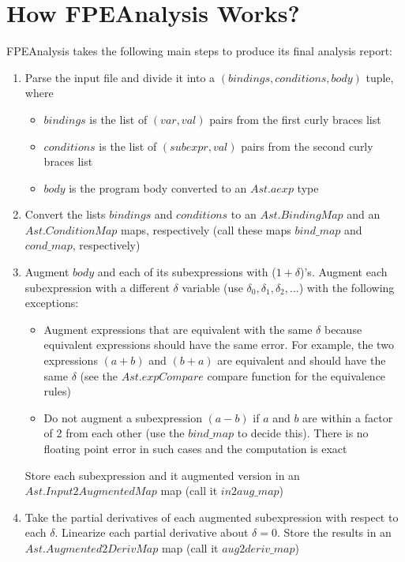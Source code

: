 \documentclass{article}
\begin{document}
\section{How FPEAnalysis Works?}
FPEAnalysis takes the following main steps to produce its final analysis report:
\begin{enumerate}
	\item Parse the input file and divide it into a $(bindings, conditions, body)$ tuple, where 
	\begin{itemize}
		\item $bindings$ is the list of $(var, val)$ pairs from the first curly braces list
		\item $conditions$ is the list of $(subexpr, val)$ pairs from the second curly braces list
		\item $body$ is the program body converted to an $Ast.aexp$ type
	\end{itemize}
	
	\item Convert the lists $bindings$ and $conditions$ to an $Ast.BindingMap$ and an $Ast.ConditionMap$ maps, respectively (call these maps $bind\_map$ and $cond\_map$, respectively) 

	\item Augment $body$ and each of its subexpressions with ($1 + \delta$)'s. Augment each subexpression with a different $\delta$ variable (use $\delta_0, \delta_1, \delta_2, ...$) with the following exceptions:
	\begin{itemize}
		\item Augment expressions that are equivalent with the same $\delta$ because equivalent expressions should have the same error. For example, the two expressions $(a + b)$ and $(b + a)$ are equivalent and should have the same $\delta$ (see the $Ast.expCompare$ compare function for the equivalence rules)
		\item Do not augment a subexpression $(a - b)$ if $a$ and $b$ are within a factor of 2 from each other (use the $bind\_map$ to decide this). There is no floating point error in such cases and the computation is exact
	\end{itemize}
	Store each subexpression and it augmented version in an $Ast.Input2AugmentedMap$ map (call it $in2aug\_map$)
	
	\item Take the partial derivatives of each augmented subexpression with respect to each $\delta$. Linearize each partial derivative about $\delta = 0$. Store the results in an $Ast.Augmented2DerivMap$ map (call it $aug2deriv\_map$)


\end{enumerate}
\end{document}
